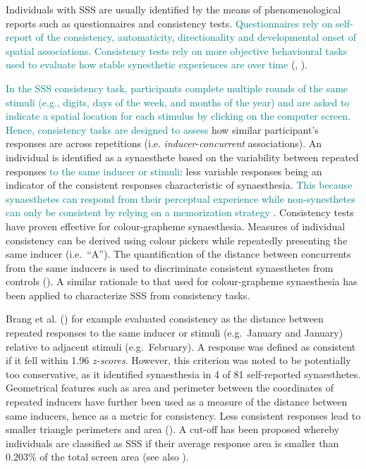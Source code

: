\documentclass[
  man,
  floatsintext,
  longtable,
  a4paper,
  nolmodern,
  notxfonts,
  notimes,
  colorlinks=true,linkcolor=blue,citecolor=blue,urlcolor=blue]{apa7}
\begin{document}
Individuals with SSS are usually identified by the means of
phenomenological reports such as questionnaires and consistency tests.
\textcolor{teal}{Questionnaires rely on self-report of the consistency, automaticity, directionality and developmental onset of spatial associations. Consistency tests rely on more objective behavioural tasks used to evaluate how stable synesthetic experiences are over time }(, ).

\textcolor{teal}{In the SSS consistency task, participants complete multiple rounds of the same stimuli (e.g., digits, days of the week, and months of the year) and are asked to indicate a spatial location for each stimulus by clicking on the computer screen. Hence, consistency tasks are designed to assess}
how similar participant's responses are across repetitions (i.e.
\emph{inducer}-\emph{concurrent} associations). An individual is
identified as a synaesthete based on the variability between repeated
responses \textcolor{teal}{to the same inducer or stimuli}: less
variable responses being an indicator of the consistent responses
characteristic of synaesthesia.
\textcolor{teal}{This because synaesthetes can respond from their perceptual experience while non-synesthetes can only be consistent by relying on a memorization strategy}
.
Consistency tests have proven effective for colour-grapheme
synaesthesia. Measures of individual consistency can be derived using
colour pickers while repeatedly presenting the same inducer
(i.e.~``A''). The quantification of the distance between concurrents
from the same inducers is used to discriminate consistent synaesthetes
from controls (). A
similar rationale to that used for colour-grapheme synaesthesia has been
applied to characterize SSS from consistency tasks.

Brang et al. () for example evaluated
consistency as the distance between repeated responses to the same
inducer or stimuli (e.g.~January and January) relative to adjacent
stimuli (e.g.~February). A response was defined as consistent if it fell
within 1.96 \emph{z-scores}. However, this criterion was noted to be
potentially too conservative, as it identified synaesthesia in 4 of 81
self-reported synaesthetes. Geometrical features such as area and
perimeter between the coordinates of repeated inducers have further been
used as a measure of the distance between same inducers, hence as a
metric for consistency. Less consistent responses lead to smaller
triangle perimeters and area (). A cut-off has been proposed whereby individuals are classified
as SSS if their average response area is smaller than 0.203\% of the
total screen area (see also ).
\end{document}

